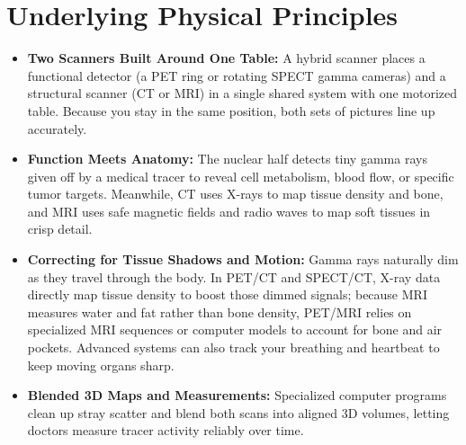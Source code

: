 \section{Underlying Physical Principles}
\begin{itemize}
    \item \textbf{Two Scanners Built Around One Table:} A hybrid scanner places a functional detector (a PET ring or rotating SPECT gamma cameras) and a structural scanner (CT or MRI) in a single shared system with one motorized table. Because you stay in the same position, both sets of pictures line up accurately.
    \item \textbf{Function Meets Anatomy:} The nuclear half detects tiny gamma rays given off by a medical tracer to reveal cell metabolism, blood flow, or specific tumor targets. Meanwhile, CT uses X-rays to map tissue density and bone, and MRI uses safe magnetic fields and radio waves to map soft tissues in crisp detail.
    \item \textbf{Correcting for Tissue Shadows and Motion:} Gamma rays naturally dim as they travel through the body. In PET/CT and SPECT/CT, X-ray data directly map tissue density to boost those dimmed signals; because MRI measures water and fat rather than bone density, PET/MRI relies on specialized MRI sequences or computer models to account for bone and air pockets. Advanced systems can also track your breathing and heartbeat to keep moving organs sharp.
    \item \textbf{Blended 3D Maps and Measurements:} Specialized computer programs clean up stray scatter and blend both scans into aligned 3D volumes, letting doctors measure tracer activity reliably over time.
\end{itemize}

